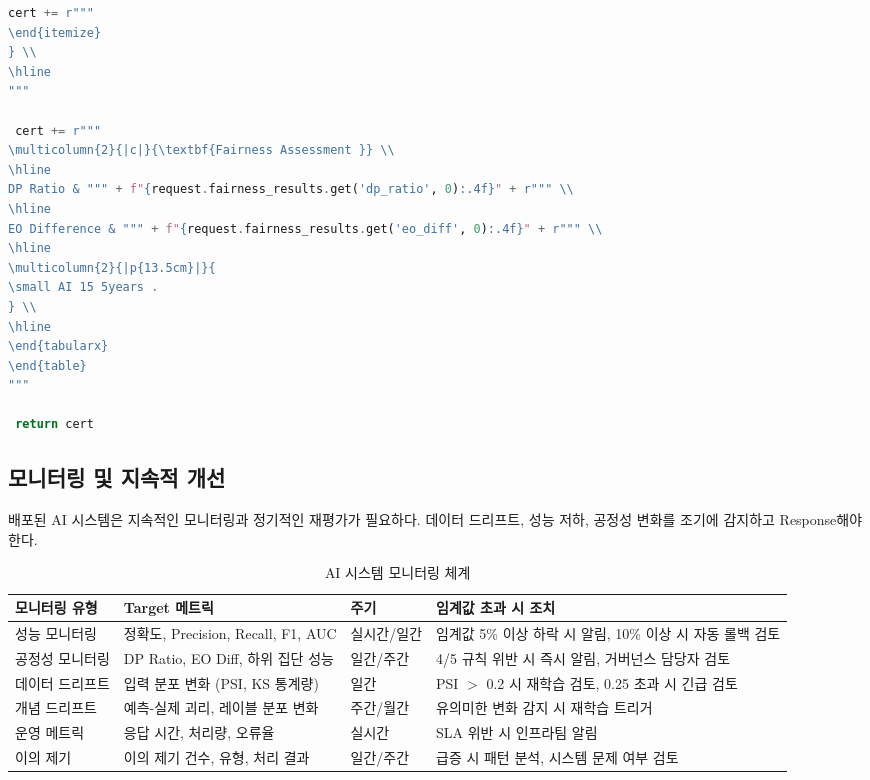 \begin{lstlisting}[language=Python, caption={Automated Deployment Approval System}, label={lst:approval_system}]
 cert += r"""
\end{itemize}
} \\
\hline
"""
 
 cert += r"""
\multicolumn{2}{|c|}{\textbf{Fairness Assessment }} \\
\hline
DP Ratio & """ + f"{request.fairness_results.get('dp_ratio', 0):.4f}" + r""" \\
\hline
EO Difference & """ + f"{request.fairness_results.get('eo_diff', 0):.4f}" + r""" \\
\hline
\multicolumn{2}{|p{13.5cm}|}{
\small AI 15 5years .
} \\
\hline
\end{tabularx}
\end{table}
"""
 
 return cert
\end{lstlisting}


\subsection{모니터링 및 지속적 개선}
\label{sec:4.3.4}

배포된 AI 시스템은 지속적인 모니터링과 정기적인 재평가가 필요하다. 
데이터 드리프트, 성능 저하, 공정성 변화를 조기에 감지하고 Response해야 한다.

\begin{table}[htbp]
\centering
\caption{AI 시스템 모니터링 체계}
\label{tab:monitoring_framework}
\begin{tabularx}{\textwidth}{p{2.5cm}p{3cm}p{2.5cm}X}
\toprule
\textbf{모니터링 유형} & \textbf{Target 메트릭} & \textbf{주기} & \textbf{임계값 초과 시 조치} \\
\midrule
성능 모니터링 & 
정확도, Precision, Recall, F1, AUC & 
실시간/일간 & 
임계값 5\% 이상 하락 시 알림, 10\% 이상 시 자동 롤백 검토 \\
\midrule
공정성 모니터링 & 
DP Ratio, EO Diff, 하위 집단 성능 & 
일간/주간 & 
4/5 규칙 위반 시 즉시 알림, 거버넌스 담당자 검토 \\
\midrule
데이터 드리프트 & 
입력 분포 변화 (PSI, KS 통계량) & 
일간 & 
PSI $>$ 0.2 시 재학습 검토, 0.25 초과 시 긴급 검토 \\
\midrule
개념 드리프트 & 
예측-실제 괴리, 레이블 분포 변화 & 
주간/월간 & 
유의미한 변화 감지 시 재학습 트리거 \\
\midrule
운영 메트릭 & 
응답 시간, 처리량, 오류율 & 
실시간 & 
SLA 위반 시 인프라팀 알림 \\
\midrule
이의 제기 & 
이의 제기 건수, 유형, 처리 결과 & 
일간/주간 & 
급증 시 패턴 분석, 시스템 문제 여부 검토 \\
\bottomrule
\end{tabularx}
\end{table}


